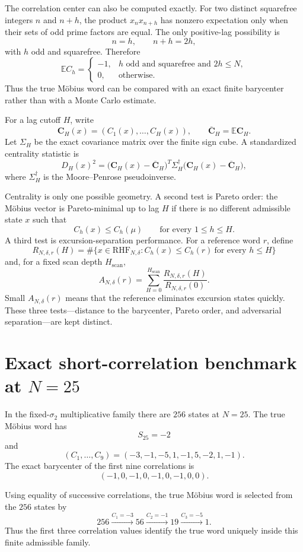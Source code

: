 \documentclass[11pt]{article}
\newcommand{\RHF}{\mathrm{RHF}}
\begin{document}
The correlation center can also be computed exactly. For two distinct squarefree integers $n$ and $n+h$, the product $x_nx_{n+h}$ has nonzero expectation only when their sets of odd prime factors are equal. The only positive-lag possibility is
\[
 n=h,\qquad n+h=2h,
\]
with $h$ odd and squarefree. Therefore
\[
 \mathbb E C_h=
 \begin{cases}
 -1,&h\text{ odd and squarefree and }2h\le N,\\
 0,&\text{otherwise}.
 \end{cases}
\]
Thus the true Möbius word can be compared with an exact finite barycenter rather than with a Monte Carlo estimate.

For a lag cutoff $H$, write
\[
 \mathbf C_H(x)=(C_1(x),\ldots,C_H(x)),
 \qquad
 \overline{\mathbf C}_H=\mathbb E\mathbf C_H.
\]
Let $\Sigma_H$ be the exact covariance matrix over the finite sign cube. A standardized centrality statistic is
\[
 D_H(x)^2
 =\bigl(\mathbf C_H(x)-\overline{\mathbf C}_H\bigr)^T
 \Sigma_H^\dagger
 \bigl(\mathbf C_H(x)-\overline{\mathbf C}_H\bigr),
\]
where $\Sigma_H^\dagger$ is the Moore--Penrose pseudoinverse.

Centrality is only one possible geometry. A second test is Pareto order: the Möbius vector is Pareto-minimal up to lag $H$ if there is no different admissible state $x$ such that
\[
 C_h(x)\le C_h(\mu)
 \qquad\text{for every }1\le h\le H.
\]
A third test is excursion-separation performance. For a reference word $r$, define
\[
 R_{N,\delta,r}(H)
 =\#\{x\in\RHF_{N,\delta}:
 C_h(x)\le C_h(r)\ \text{for every }h\le H\}
\]
and, for a fixed scan depth $H_{\mathrm{scan}}$,
\[
 A_{N,\delta}(r)
 =\sum_{H=0}^{H_{\mathrm{scan}}}
 \frac{R_{N,\delta,r}(H)}{R_{N,\delta,r}(0)}.
\]
Small $A_{N,\delta}(r)$ means that the reference eliminates excursion states quickly. These three tests---distance to the barycenter, Pareto order, and adversarial separation---are kept distinct.

\section{Exact short-correlation benchmark at $N=25$}
In the fixed-$\sigma_2$ multiplicative family there are $256$ states at $N=25$. The true Möbius word has
\[
 S_{25}=-2
\]
and
\[
 (C_1,\ldots,C_9)
 =(-3,-1,-5,1,-1,5,-2,1,-1).
\]
The exact barycenter of the first nine correlations is
\[
 (-1,0,-1,0,-1,0,-1,0,0).
\]

Using equality of successive correlations, the true Möbius word is selected from the $256$ states by
\[
 256\xrightarrow{C_1=-3}56
 \xrightarrow{C_2=-1}19
 \xrightarrow{C_3=-5}1.
\]
Thus the first three correlation values identify the true word uniquely inside this finite admissible family.
\end{document}
